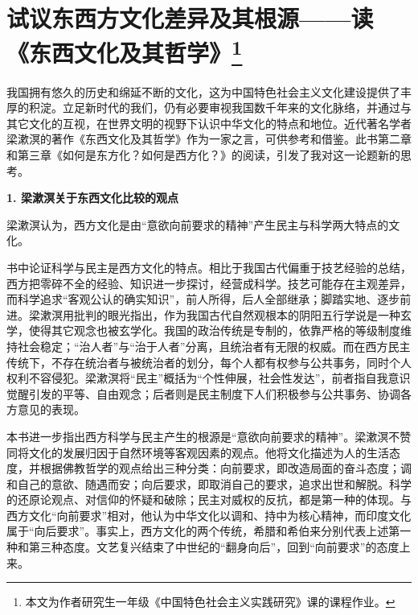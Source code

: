 \par {}

\section*{试议东西方文化差异及其根源——读《东西文化及其哲学》\footnote{本文为作者研究生一年级《中国特色社会主义实践研究》课的课程作业。}}

\par 我国拥有悠久的历史和绵延不断的文化，这为中国特色社会主义文化建设提供了丰厚的积淀。立足新时代的我们，仍有必要审视我国数千年来的文化脉络，并通过与其它文化的互视，在世界文明的视野下认识中华文化的特点和地位。近代著名学者梁漱溟的著作《东西文化及其哲学》作为一家之言，可供参考和借鉴。此书第二章和第三章《如何是东方化？如何是西方化？》的阅读，引发了我对这一论题新的思考。
\par \textbf{1. 梁漱溟关于东西文化比较的观点}
\par 梁漱溟认为，西方文化是由“意欲向前要求的精神”产生民主与科学两大特点的文化。
\par 书中论证科学与民主是西方文化的特点。相比于我国古代偏重于技艺经验的总结，西方把零碎不全的经验、知识进一步探讨，经营成科学。技艺可能存在主观差异，而科学追求“客观公认的确实知识”，前人所得，后人全部继承；脚踏实地、逐步前进。梁漱溟用批判的眼光指出，作为我国古代自然观根本的阴阳五行学说是一种玄学，使得其它观念也被玄学化。我国的政治传统是专制的，依靠严格的等级制度维持社会稳定；“治人者”与“治于人者”分离，且统治者有无限的权威。而在西方民主传统下，不存在统治者与被统治者的划分，每个人都有权参与公共事务，同时个人权利不容侵犯。梁漱溟将“民主”概括为“个性伸展，社会性发达”，前者指自我意识觉醒引发的平等、自由观念；后者则是民主制度下人们积极参与公共事务、协调各方意见的表现。
\par 本书进一步指出西方科学与民主产生的根源是“意欲向前要求的精神”。梁漱溟不赞同将文化的发展归因于自然环境等客观因素的观点。他将文化描述为人的生活态度，并根据佛教哲学的观点给出三种分类：向前要求，即改造局面的奋斗态度；调和自己的意欲、随遇而安；向后要求，即取消自己的要求，追求出世和解脱。科学的还原论观点、对信仰的怀疑和破除；民主对威权的反抗，都是第一种的体现。与西方文化“向前要求”相对，他认为中华文化以调和、持中为核心精神，而印度文化属于“向后要求”。事实上，西方文化的两个传统，希腊和希伯来分别代表上述第一种和第三种态度。文艺复兴结束了中世纪的“翻身向后”，回到“向前要求”的态度上来。

